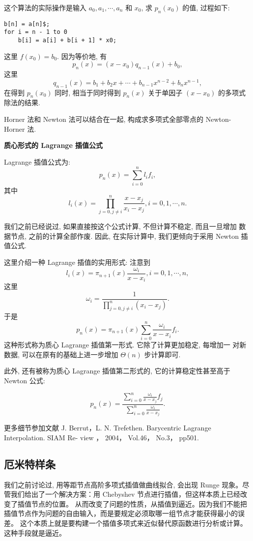 \documentclass[a4paper]{ctexart}
\begin{document}
{这个算法的实际操作是输入 $a_0, a_1, \cdots, a_n$ 和 $x_0$, 求
$p_n(x_0)$ 的值, 过程如下:

\begin{verbatim}
b[n] = a[n]$;
for i = n - 1 to 0
    b[i] = a[i] + b[i + 1] * x0;
\end{verbatim}

这里 $f(x_0) = b_0$.  因为等价地, 有
$$
p_n(x) = (x - x_0)q_{n - 1}(x) + b_0,
$$
这里
$$
q_{n - 1}(x) = b_1 + b_2 x + \cdots + b_{n - 1} x^{n - 2} + b_n x^{n - 1},
$$
在得到 $p_n(x_0)$ 同时, 相当于同时得到 $p_n(x)$ 关于单因子 $(x -
x_0)$ 的多项式除法的结果.

Horner 法和 Newton 法可以结合在一起, 构成求多项式全部零点的
Newton-Horner 法.

{\bf 质心形式的 Lagrange 插值公式}

Lagrange 插值公式为:
$$
p_n(x) = \sum_{i = 0}^n l_i f_i,
$$
其中
$$
l_i(x) = \prod_{j = 0, j \neq i}^n \frac{x - x_j}{x_i - x_j}, i = 0, 1, \cdots, n.
$$

我们之前已经说过, 如果直接按这个公式计算, 不但计算不稳定, 而且一旦增加
数据节点, 之前的计算全部作废. 因此, 在实际计算中, 我们更倾向于采用
Newton 插值公式.

这里介绍一种 Lagrange 插值的实用形式: 注意到
$$
l_i(x) = \pi_{n + 1}(x) \frac{\omega_i}{x - x_i}, i = 0, 1, \cdots, n,
$$
这里
$$
\omega_i = \frac{1}{\displaystyle \prod_{j = 0, j \neq i}^n (x_i - x_j)}.
$$
于是
$$
p_n(x) = \pi_{n + 1}(x)\sum_{i = 0}^n \frac{\omega_i}{x - x_i} f_i.
$$
这种形式称为质心 Lagrange 插值第一形式. 它除了计算更加稳定, 每增加一
对新数据, 可以在原有的基础上进一步增加 $\Theta(n)$ 步计算即可.

此外, 还有被称为质心 Lagrange 插值第二形式的, 它的计算稳定性甚至高于
Newton 公式:

$$
p_n(x) = \frac{\displaystyle\sum_{i = 0}^n\frac{\omega_i}{x - x_j} f_j}
  {\displaystyle\sum_{i = 0}^n\frac{\omega_i}{x - x_j}}.
$$

更多细节参加文献 J. Berrut，L. N. Trefethen. Barycentric Lagrange Interpolation. SIAM Re-
view ， 2004， Vol.46， No.3， pp501.

\subsection{厄米特样条}

我们之前讨论过, 用等距节点高阶多项式插值做曲线拟合, 会出现 Runge 现象。尽管我们给出了一个解决方案：用 Chebyshev 节点进行插值，但这样本质上已经改变了插值节点的位置。
从而改变了问题的性质，从插值到逼近。因为我们不能把插值节点作为问题的自由输入，而是要规定必须取哪一组节点才能获得最小的误差。
这个本质上就是要构建一个插值多项式来近似替代原函数进行分析或计算。这种手段就是逼近。

}
\end{document}
